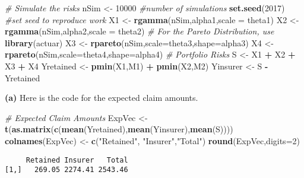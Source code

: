 \documentclass[]{book}
\newenvironment{Shaded}{\begin{snugshade}}{\end{snugshade}}
\newcommand{\KeywordTok}[1]{\textcolor[rgb]{0.13,0.29,0.53}{\textbf{#1}}}
\newcommand{\DataTypeTok}[1]{\textcolor[rgb]{0.13,0.29,0.53}{#1}}
\newcommand{\DecValTok}[1]{\textcolor[rgb]{0.00,0.00,0.81}{#1}}
\newcommand{\StringTok}[1]{\textcolor[rgb]{0.31,0.60,0.02}{#1}}
\newcommand{\CommentTok}[1]{\textcolor[rgb]{0.56,0.35,0.01}{\textit{#1}}}
\newcommand{\OperatorTok}[1]{\textcolor[rgb]{0.81,0.36,0.00}{\textbf{#1}}}
\newcommand{\NormalTok}[1]{#1}
\theoremstyle{definition}
\theoremstyle{definition}
\theoremstyle{definition}
\theoremstyle{remark}
\begin{document}
\begin{Shaded}
\begin{Highlighting}[]
\CommentTok{# Simulate the risks}
\NormalTok{nSim <-}\StringTok{ }\DecValTok{10000}  \CommentTok{#number of simulations}
\KeywordTok{set.seed}\NormalTok{(}\DecValTok{2017}\NormalTok{) }\CommentTok{#set seed to reproduce work }
\NormalTok{X1 <-}\StringTok{ }\KeywordTok{rgamma}\NormalTok{(nSim,alpha1,}\DataTypeTok{scale =}\NormalTok{ theta1)  }
\NormalTok{X2 <-}\StringTok{ }\KeywordTok{rgamma}\NormalTok{(nSim,alpha2,}\DataTypeTok{scale =}\NormalTok{ theta2)  }
\CommentTok{# For the Pareto Distribution, use}
\KeywordTok{library}\NormalTok{(actuar)}
\NormalTok{X3 <-}\StringTok{ }\KeywordTok{rpareto}\NormalTok{(nSim,}\DataTypeTok{scale=}\NormalTok{theta3,}\DataTypeTok{shape=}\NormalTok{alpha3)}
\NormalTok{X4 <-}\StringTok{ }\KeywordTok{rpareto}\NormalTok{(nSim,}\DataTypeTok{scale=}\NormalTok{theta4,}\DataTypeTok{shape=}\NormalTok{alpha4)}
\CommentTok{# Portfolio Risks}
\NormalTok{S         <-}\StringTok{ }\NormalTok{X1 }\OperatorTok{+}\StringTok{ }\NormalTok{X2 }\OperatorTok{+}\StringTok{ }\NormalTok{X3 }\OperatorTok{+}\StringTok{ }\NormalTok{X4}
\NormalTok{Yretained <-}\StringTok{ }\KeywordTok{pmin}\NormalTok{(X1,M1) }\OperatorTok{+}\StringTok{ }\KeywordTok{pmin}\NormalTok{(X2,M2)}
\NormalTok{Yinsurer  <-}\StringTok{ }\NormalTok{S }\OperatorTok{-}\StringTok{ }\NormalTok{Yretained}
\end{Highlighting}
\end{Shaded}

\textbf{(a)} Here is the code for the expected claim amounts.

\begin{Shaded}
\begin{Highlighting}[]
\CommentTok{# Expected Claim Amounts}
\NormalTok{ExpVec <-}\StringTok{ }\KeywordTok{t}\NormalTok{(}\KeywordTok{as.matrix}\NormalTok{(}\KeywordTok{c}\NormalTok{(}\KeywordTok{mean}\NormalTok{(Yretained),}\KeywordTok{mean}\NormalTok{(Yinsurer),}\KeywordTok{mean}\NormalTok{(S))))}
\KeywordTok{colnames}\NormalTok{(ExpVec) <-}\StringTok{ }\KeywordTok{c}\NormalTok{(}\StringTok{"Retained"}\NormalTok{, }\StringTok{"Insurer"}\NormalTok{,}\StringTok{"Total"}\NormalTok{)}
\KeywordTok{round}\NormalTok{(ExpVec,}\DataTypeTok{digits=}\DecValTok{2}\NormalTok{)}
\end{Highlighting}
\end{Shaded}

\begin{verbatim}
     Retained Insurer   Total
[1,]   269.05 2274.41 2543.46
\end{verbatim}
\end{document}

